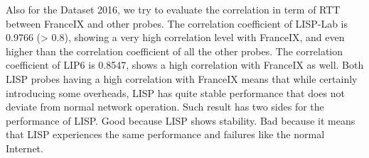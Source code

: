 Also for the Dataset 2016, we try to evaluate the correlation in term of RTT between FranceIX and other probes. %
The correlation coefficient of LISP-Lab is 0.9766 (> 0.8), showing a very high correlation level with FranceIX, and even higher than the correlation coefficient of all the other probes. The correlation coefficient of LIP6 is 0.8547, shows a high correlation with FranceIX as well. Both LISP probes having a high correlation with FranceIX means that while certainly introducing some overheads, LISP has quite stable performance that does not deviate from normal network operation. Such result has two sides for the performance of LISP. Good because LISP shows stability. Bad because it means that LISP experiences the same performance and failures like the normal Internet.

